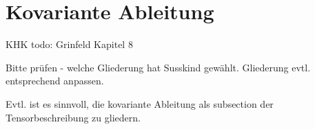 \section{Kovariante Ableitung}

KHK todo: Grinfeld Kapitel 8

Bitte prüfen - welche Gliederung hat Susskind gewählt. Gliederung evtl. entsprechend anpassen.

Evtl. ist es sinnvoll, die kovariante Ableitung als subsection der Tensorbeschreibung zu gliedern.


